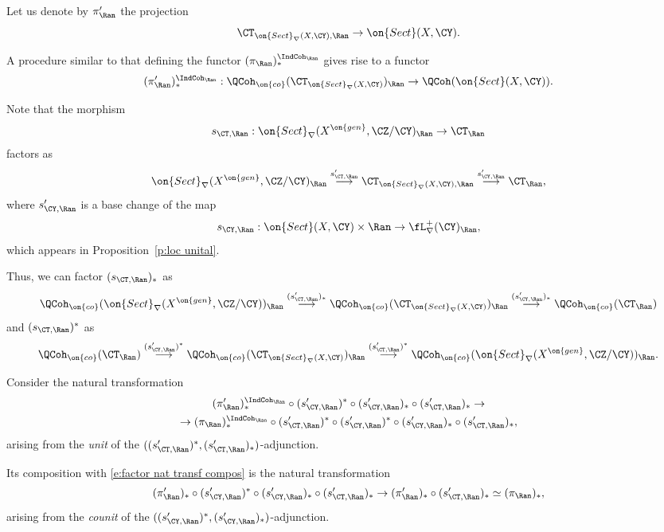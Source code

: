 \documentclass[9pt]{amsart}
\theoremstyle{remark}
\theoremstyle{definition}
\theoremstyle{remark}
\newcommand{\propref}[1]{Proposition~\ref{#1}}
\numberwithin{equation}{section}
\begin{document}
Let us denote by $\pi'_\Ran$ the projection
$$\CT_{\on{Sect}_\nabla(X,\CY),\Ran} \to 
\on{Sect}(X,\CY).$$

\medskip

A procedure similar to that defining the functor $(\pi_\Ran)^{\IndCoh_\Ran}_*$ gives rise to a functor
$$(\pi'_\Ran)^{\IndCoh_\Ran}_*:\QCoh_{\on{co}}(\CT_{\on{Sect}_\nabla(X,\CY)})_\Ran\to 
\QCoh(\on{Sect}(X,\CY)).$$

\sssec{}

Note that the morphism
$$s_{\CT,\Ran}: \on{Sect}_\nabla(X^{\on{gen}},\CZ/\CY)_\Ran\to  \CT_\Ran$$
factors as 
$$\on{Sect}_\nabla(X^{\on{gen}},\CZ/\CY)_\Ran \overset{s'_{\CT,\Ran}}\longrightarrow
\CT_{\on{Sect}_\nabla(X,\CY),\Ran}
\overset{s'_{\CY,\Ran}}\longrightarrow \CT_\Ran,$$
where $s'_{\CY,\Ran}$ is a base change of the map
$$s_{\CY,\Ran}:\on{Sect}(X,\CY)\times \Ran\to \fL^+_\nabla(\CY)_\Ran,$$
which appears in \propref{p:loc unital}. 

\medskip

Thus, we can factor $(s_{\CT,\Ran})_*$ as
$$\QCoh_{\on{co}}(\on{Sect}_\nabla(X^{\on{gen}},\CZ/\CY))_\Ran
\overset{(s'_{\CT,\Ran})_*}\longrightarrow \QCoh_{\on{co}}(\CT_{\on{Sect}_\nabla(X,\CY)})_\Ran
\overset{(s'_{\CY,\Ran})_*}\longrightarrow  \QCoh_{\on{co}}(\CT_\Ran)$$
and $(s_{\CT,\Ran})^*$ as 
$$
\QCoh_{\on{co}}(\CT_\Ran) \overset{(s'_{\CY,\Ran})^*}\longrightarrow
\QCoh_{\on{co}}(\CT_{\on{Sect}_\nabla(X,\CY)})_\Ran \overset{(s'_{\CT,\Ran})^*}\longrightarrow 
\QCoh_{\on{co}}(\on{Sect}_\nabla(X^{\on{gen}},\CZ/\CY))_\Ran.$$

\sssec{}

Consider the natural transformation 
\begin{multline} \label{e:factor nat transf 1}
(\pi'_\Ran)^{\IndCoh_\Ran}_*\circ (s'_{\CY,\Ran})^*\circ (s'_{\CY,\Ran})_*\circ (s'_{\CT,\Ran})_*\to \\
\to (\pi_\Ran)^{\IndCoh_\Ran}_*\circ (s'_{\CT,\Ran})^*\circ (s'_{\CY,\Ran})^*\circ (s'_{\CY,\Ran})_*\circ (s'_{\CT,\Ran})_*,
\end{multline}
arising from the \emph{unit} of the $((s'_{\CT,\Ran})^*,(s'_{\CT,\Ran})_*)$-adjunction.

\medskip

Its composition with \eqref{e:factor nat transf compos} is the natural transformation
\begin{equation} \label{e:factor nat transf 2}
(\pi'_\Ran)_*\circ (s'_{\CY,\Ran})^*\circ (s'_{\CY,\Ran})_*\circ (s'_{\CT,\Ran})_*\to 
(\pi'_\Ran)_*\circ (s'_{\CT,\Ran})_* \simeq (\pi_\Ran)_*,
\end{equation}
arising from the \emph{counit} of the $((s'_{\CY,\Ran})^*,(s'_{\CY,\Ran})_*)$-adjunction.
\end{document}
